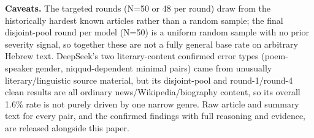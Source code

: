 \documentclass[11pt]{article}
\begin{document}
\textbf{Caveats.} The targeted rounds (N=50 or 48 per round) draw from the historically hardest known articles rather than a random sample; the final disjoint-pool round per model (N=50) is a uniform random sample with no prior severity signal, so together these are not a fully general base rate on arbitrary Hebrew text. DeepSeek's two literary-content confirmed error types (poem-speaker gender, niqqud-dependent minimal pairs) came from unusually literary/linguistic source material, but its disjoint-pool and round-1/round-4 clean results are all ordinary news/Wikipedia/biography content, so its overall 1.6\% rate is not purely driven by one narrow genre. Raw article and summary text for every pair, and the confirmed findings with full reasoning and evidence, are released alongside this paper.
\end{document}
